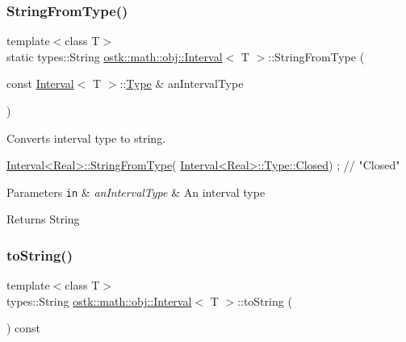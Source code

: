 \subsubsection{\texorpdfstring{String\+From\+Type()}{StringFromType()}}
{\footnotesize\ttfamily template$<$class T$>$ \\
static types\+::\+String \hyperlink{classostk_1_1math_1_1obj_1_1_interval}{ostk\+::math\+::obj\+::\+Interval}$<$ T $>$\+::String\+From\+Type (\begin{DoxyParamCaption}\item[{const \hyperlink{classostk_1_1math_1_1obj_1_1_interval}{Interval}$<$ T $>$\+::\hyperlink{classostk_1_1math_1_1obj_1_1_interval_base_a0dd9bd29a9bfefa26de9b88ac81de92a}{Type} \&}]{an\+Interval\+Type }\end{DoxyParamCaption})\hspace{0.3cm}{\ttfamily [static]}}



Converts interval type to string. 


\begin{DoxyCode}
\hyperlink{classostk_1_1math_1_1obj_1_1_interval_abe58217bb3d134390c49652e53e2e57e}{Interval<Real>::StringFromType}(
      \hyperlink{classostk_1_1math_1_1obj_1_1_interval_base_a0dd9bd29a9bfefa26de9b88ac81de92aa03f4a47830f97377a35321051685071e}{Interval<Real>::Type::Closed}) ; \textcolor{comment}{// "Closed"}
\end{DoxyCode}



\begin{DoxyParams}[1]{Parameters}
\mbox{\tt in}  & {\em an\+Interval\+Type} & An interval type \\
\hline
\end{DoxyParams}
\begin{DoxyReturn}{Returns}
String 
\end{DoxyReturn}
\mbox{\label{classostk_1_1math_1_1obj_1_1_interval_ab467cbf6bc51f3adefa75f0667a7b26c}} 
\subsubsection{\texorpdfstring{to\+String()}{toString()}}
{\footnotesize\ttfamily template$<$class T$>$ \\
types\+::\+String \hyperlink{classostk_1_1math_1_1obj_1_1_interval}{ostk\+::math\+::obj\+::\+Interval}$<$ T $>$\+::to\+String (\begin{DoxyParamCaption}{ }\end{DoxyParamCaption}) const}



